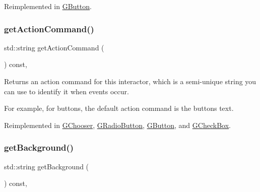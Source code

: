 Reimplemented in \mbox{\hyperlink{classGButton_a57806dc9defb73f76f493f8548319924}{G\+Button}}.

\mbox{\label{classGInteractor_a94eb4276000c4fdfb508ce9e6317a82a}} 
\subsubsection{\texorpdfstring{get\+Action\+Command()}{getActionCommand()}}
{\footnotesize\ttfamily std\+::string get\+Action\+Command (\begin{DoxyParamCaption}{ }\end{DoxyParamCaption}) const\hspace{0.3cm}{\ttfamily [virtual]}, {\ttfamily [inherited]}}



Returns an action command for this interactor, which is a semi-\/unique string you can use to identify it when events occur. 

For example, for buttons, the default action command is the button\textquotesingle{}s text. 

Reimplemented in \mbox{\hyperlink{classGChooser_a4f83505141da1f8446f0e0e0a9507930}{G\+Chooser}}, \mbox{\hyperlink{classGRadioButton_a4f83505141da1f8446f0e0e0a9507930}{G\+Radio\+Button}}, \mbox{\hyperlink{classGButton_a4f83505141da1f8446f0e0e0a9507930}{G\+Button}}, and \mbox{\hyperlink{classGCheckBox_a4f83505141da1f8446f0e0e0a9507930}{G\+Check\+Box}}.

\mbox{\label{classGInteractor_a808e22cc1fdfbecf71ed8c64ef4600e0}} 
\subsubsection{\texorpdfstring{get\+Background()}{getBackground()}}
{\footnotesize\ttfamily std\+::string get\+Background (\begin{DoxyParamCaption}{ }\end{DoxyParamCaption}) const\hspace{0.3cm}{\ttfamily [virtual]}, {\ttfamily [inherited]}}



